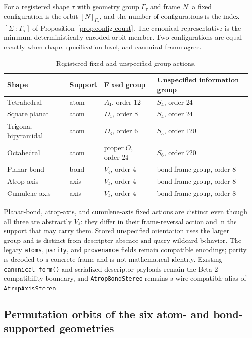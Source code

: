 \documentclass[pdflatex,sn-mathphys-num,referee,lineno]{sn-jnl}
\newcommand{\code}[1]{\texttt{#1}}
\theoremstyle{plain}
\theoremstyle{remark}
\theoremstyle{definition}
\begin{document}
For a registered shape \(\tau\) with geometry group \(\Gamma_\tau\) and frame
\(N\), a fixed configuration is the orbit \([N]_{\Gamma_\tau}\), and the number
of configurations is the index \([\Sigma_\tau:\Gamma_\tau]\) of
Proposition~\ref{prop:config-count}.  The canonical representative is
the minimum deterministically encoded orbit member.  Two configurations are
equal exactly when shape, specification level, and canonical frame agree.

\begin{table}[htbp]
\caption{Registered fixed and unspecified group actions.}
\label{tab:groups}
\centering
\begin{tabularx}{\textwidth}{@{}llXX@{}}
\toprule
Shape & Support & Fixed group & Unspecified information group \\
\midrule
Tetrahedral & atom & \(A_4\), order 12 & \(S_4\), order 24 \\
Square planar & atom & \(D_4\), order 8 & \(S_4\), order 24 \\
Trigonal bipyramidal & atom & \(D_3\), order 6 & \(S_5\), order 120 \\
Octahedral & atom & proper \(O\), order 24 & \(S_6\), order 720 \\
Planar bond & bond & \(V_4\), order 4 & bond-frame group, order 8 \\
Atrop axis & axis & \(V_4\), order 4 & bond-frame group, order 8 \\
Cumulene axis & axis & \(V_4\), order 4 & bond-frame group, order 8 \\
\bottomrule
\end{tabularx}
\end{table}

Planar-bond, atrop-axis, and cumulene-axis fixed actions are distinct even
though all three are abstractly \(V_4\): they differ in their frame-reversal
action and in the support that may carry them.  Stored unspecified orientation
uses the larger group and is distinct from descriptor absence and query
wildcard behavior.  The legacy
\code{atoms}, \code{parity}, and \code{provenance} fields remain compatible
encodings; parity is decoded to a concrete frame and is not mathematical
identity.  Existing \code{canonical\_form()} and serialized descriptor payloads
remain the Beta-2 compatibility boundary, and \code{AtropBondStereo} remains a
wire-compatible alias of \code{AtropAxisStereo}.

\subsection{Permutation orbits of the six atom- and bond-supported geometries}
\label{sec:si-orbits}
\end{document}
